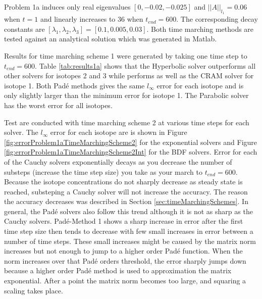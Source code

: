 Problem 1a induces only real eigenvalues $[0, -0.02, -0.025]$ and $||A||_{l_{1}} =0.06$ when $t=1$ and linearly increases to $36$ when $t_{end}=600$. The corresponding decay constants are $[\lambda_{1}, \lambda_{2}, \lambda_{3}] = [0.1, 0.005, 0.03]$. Both time marching methods are tested against an analytical solution which was generated in Matlab. 


Results for time marching scheme 1 were generated by taking one time step to $t_{end} = 600$. Table \ref{tab:results1a} shows that the Hyperbolic solver outperforms all other solvers for isotopes 2 and 3 while performs as well as the CRAM solver for isotope 1. Both Pad\'e methods gives the same $l_{\infty}$ error for each isotope and is only slightly larger than the minimum error for isotope 1. The Parabolic solver has the worst error for all isotopes. 

Test are conducted with time marching scheme 2 at various time steps for each solver. The $l_{\infty}$ error for each isotope are is shown in Figure \ref{fig:errorProblem1aTimeMarchingScheme2} for the exponential solvers and Figure \ref{fig:errorProblem1aTimeMarchingScheme2Int} for the BDF solvers. Error for each of the Cauchy solvers exponentially decays as you decrease the number of substeps (increase the time step size) you take as your march to $t_{end}=600$. Because the isotope concentrations do not sharply decrease as steady state is reached, substeping a Cauchy solver will not increase the accuracy. The reason the accuracy decreases was described in Section \ref{sec:timeMarchingSchemes}. In general, the Pad\'e solvers also follow this trend although it is not as sharp as the Cauchy solvers. Pad\'e-Method 1 shows a sharp increase in error after the first time step size then tends to decrease with few small increases in error between a number of time steps. These small increases might be caused by the matrix norm increases but not enough to jump to a higher order Pad\'e function. When the norm increases over that Pad\'e orders threshold, the error sharply jumps down because a higher order Pad\'e method is used to approximation the matrix exponential. After a point the matrix norm becomes too large, and squaring a scaling takes place. 


